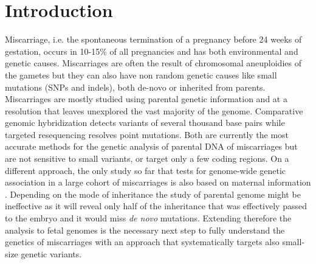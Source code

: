 
\section*{Introduction}

Miscarriage, i.e. the spontaneous termination of a pregnancy before 24 weeks of gestation, occurs in  10-15\% of all pregnancies \cite{larsen2013new,ammon2012systematic, andersen2000maternal} and has both environmental and genetic causes\cite{larsen2013new}. Miscarriages are often the result of chromosomal aneuploidies of the gametes but they can also have non random genetic causes like small mutations (SNPs and indels), both de-novo or inherited from parents. Miscarriages are mostly studied using parental genetic information \cite{pereza2017systematic} and at a resolution that leaves unexplored the vast majority of the genome. Comparative genomic hybridization detects variants of several thousand base pairs \cite{robberecht2009diagnosis, kudesia2014rescue,mathur2014miscarriage} while targeted resequencing resolves point mutations. Both are currently the most accurate methods for the genetic analysis of parental DNA of miscarriages but are not sensitive to small variants, or target only a few coding regions. On a different approach, the only study so far that tests for genome-wide genetic association in a large cohort of miscarriages is also based on maternal information \cite{laisk2020genetic}. Depending on the mode of inheritance the study of parental genome might be ineffective as it will reveal only half of the inheritance that was effectively passed to the embryo and it would miss \textit{de novo} mutations. Extending therefore the analysis to fetal genomes is the necessary next step to fully understand the genetics of miscarriages with an approach that systematically targets also small-size genetic variants. 

